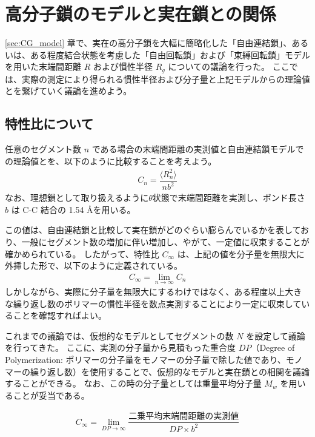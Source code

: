 \documentclass[a4paper,11pt]{jlreq}
\begin{document}
\section{高分子鎖のモデルと実在鎖との関係}

\ref{sec:CG_model} 章で、実在の高分子鎖を大幅に簡略化した「自由連結鎖」、あるいは、ある程度結合状態を考慮した「自由回転鎖」および「束縛回転鎖」モデルを用いた末端間距離 $R$ および慣性半径 $R_g$ についての議論を行った。
ここでは、実際の測定により得られる慣性半径および分子量と上記モデルからの理論値とを繋げていく議論を進めよう。


\subsection{特性比について}

任意のセグメント数 $n$ である場合の末端間距離の実測値と自由連結鎖モデルでの理論値とを、以下のように比較することを考えよう。
\begin{align}
C_n=\dfrac{ \langle R_n^2 \rangle }{n b^2}
\end{align}
なお、理想鎖として取り扱えるように$\theta$状態で末端間距離を実測し、ボンド長さ $b$ は C-C 結合の 1.54 \AA を用いる。

この値は、自由連結鎖と比較して実在鎖がどのぐらい膨らんでいるかを表しており、一般にセグメント数の増加に伴い増加し、やがて、一定値に収束することが確かめられている。
したがって、特性比 $C_{\infty}$ は、上記の値を分子量を無限大に外挿した形で、以下のように定義されている。
\begin{align}
C_{\infty}=\lim_{n \to \infty} C_n 
\label{eq:Cinf}
\end{align}
しかしながら、実際に分子量を無限大にするわけではなく、ある程度以上大きな繰り返し数のポリマーの慣性半径を数点実測することにより一定に収束していることを確認すればよい。

これまでの議論では、仮想的なモデルとしてセグメントの数 $N$ を設定して議論を行ってきた。
ここに、実測の分子量から見積もった重合度 $DP$（Degree of Polymerization: ポリマーの分子量をモノマーの分子量で除した値であり、モノマーの繰り返し数）を使用することで、仮想的なモデルと実在鎖との相関を議論することができる。
なお、この時の分子量としては重量平均分子量 $M_w$ を用いることが妥当である。

\begin{align}
C_{\infty} = \lim_{DP \to \infty} \dfrac{ \text{二乗平均末端間距離の実測値} }{DP \times b^2}
\label{fig:CR}
\end{align}
\end{document}
